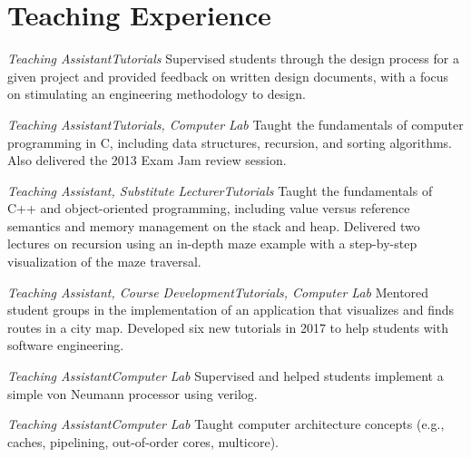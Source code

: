 \section{\sc Teaching Experience}

{\textit{Teaching Assistant}}{\textit{Tutorials}}
{
  Supervised students through the design process for a given project and provided feedback on written design documents, with a focus on stimulating an engineering methodology to design.
}

{\textit{Teaching Assistant}}{\textit{Tutorials, Computer Lab}}
{
  Taught the fundamentals of computer programming in C, including data structures, recursion, and sorting algorithms.
  Also delivered the 2013 Exam Jam review session.
}

{\textit{Teaching Assistant, Substitute Lecturer}}{\textit{Tutorials}}
{
  Taught the fundamentals of C++ and object-oriented programming, including value versus reference semantics and memory management on the stack and heap.
  Delivered two lectures on recursion using an in-depth maze example with a step-by-step visualization of the maze traversal.
}

{\textit{Teaching Assistant, Course Development}}{\textit{Tutorials, Computer Lab}}
{
  Mentored student groups in the implementation of an application that visualizes and finds routes in a city map.
  Developed six new tutorials in 2017 to help students with software engineering.
}

{\textit{Teaching Assistant}}{\textit{Computer Lab}}
{
  Supervised and helped students implement a simple von Neumann processor using verilog.
}

{\textit{Teaching Assistant}}{\textit{Computer Lab}}
{
  Taught computer architecture concepts (e.g., caches, pipelining, out-of-order cores, multicore).
}
